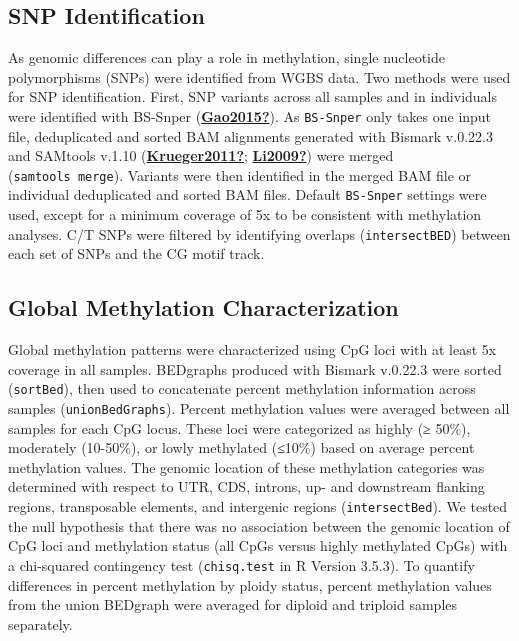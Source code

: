 \documentclass [11pt, proquest] {uwthesis}[2015/03/03]
\begin{document}
\hypertarget{snp-identification-2}{%
\subsection{SNP Identification}\label{snp-identification-2}}

As genomic differences can play a role in methylation, single nucleotide polymorphisms (SNPs) were identified from WGBS data. Two methods were used for SNP identification. First, SNP variants across all samples and in individuals were identified with BS-Snper (\protect\hyperlink{ref-Gao2015}{\textbf{Gao2015?}}). As \texttt{BS-Snper} only takes one input file, deduplicated and sorted BAM alignments generated with Bismark v.0.22.3 and SAMtools v.1.10 (\protect\hyperlink{ref-Krueger2011}{\textbf{Krueger2011?}}; \protect\hyperlink{ref-Li2009}{\textbf{Li2009?}}) were merged (\texttt{samtools\ merge}). Variants were then identified in the merged BAM file or individual deduplicated and sorted BAM files. Default \texttt{BS-Snper} settings were used, except for a minimum coverage of 5x to be consistent with methylation analyses. C/T SNPs were filtered by identifying overlaps (\texttt{intersectBED}) between each set of SNPs and the CG motif track.

\hypertarget{global-methylation-characterization-1}{%
\subsection{Global Methylation Characterization}\label{global-methylation-characterization-1}}

Global methylation patterns were characterized using CpG loci with at least 5x coverage in all samples. BEDgraphs produced with Bismark v.0.22.3 were sorted (\texttt{sortBed}), then used to concatenate percent methylation information across samples (\texttt{unionBedGraphs}). Percent methylation values were averaged between all samples for each CpG locus. These loci were categorized as highly (≥ 50\%), moderately (10-50\%), or lowly methylated (≤10\%) based on average percent methylation values. The genomic location of these methylation categories was determined with respect to UTR, CDS, introns, up- and downstream flanking regions, transposable elements, and intergenic regions (\texttt{intersectBed}). We tested the null hypothesis that there was no association between the genomic location of CpG loci and methylation status (all CpGs versus highly methylated CpGs) with a chi-squared contingency test (\texttt{chisq.test} in R Version 3.5.3). To quantify differences in percent methylation by ploidy status, percent methylation values from the union BEDgraph were averaged for diploid and triploid samples separately.
\end{document}
